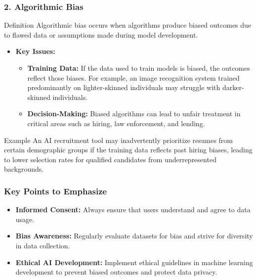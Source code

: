 \documentclass[aspectratio=169]{beamer}
\begin{document}
\begin{frame}[fragile]
    \frametitle{2. Algorithmic Bias}
    \begin{block}{Definition}
        Algorithmic bias occurs when algorithms produce biased outcomes due to flawed data or assumptions made during model development.
    \end{block}
    
    \begin{itemize}
        \item \textbf{Key Issues:}
            \begin{itemize}
                \item \textbf{Training Data:} If the data used to train models is biased, the outcomes reflect those biases. For example, an image recognition system trained predominantly on lighter-skinned individuals may struggle with darker-skinned individuals.
                \item \textbf{Decision-Making:} Biased algorithms can lead to unfair treatment in critical areas such as hiring, law enforcement, and lending.
            \end{itemize}
    \end{itemize}
    
    \begin{block}{Example}
        An AI recruitment tool may inadvertently prioritize resumes from certain demographic groups if the training data reflects past hiring biases, leading to lower selection rates for qualified candidates from underrepresented backgrounds.
    \end{block}
\end{frame}

\begin{frame}[fragile]
    \frametitle{Key Points to Emphasize}
    \begin{itemize}
        \item \textbf{Informed Consent:} Always ensure that users understand and agree to data usage.
        \item \textbf{Bias Awareness:} Regularly evaluate datasets for bias and strive for diversity in data collection.
        \item \textbf{Ethical AI Development:} Implement ethical guidelines in machine learning development to prevent biased outcomes and protect data privacy.
    \end{itemize}
\end{frame}
\end{document}
